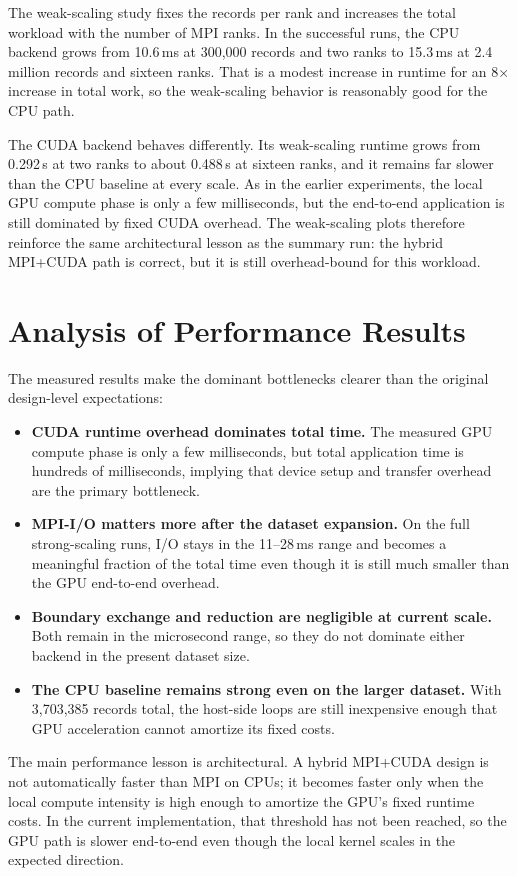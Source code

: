 \documentclass[sigconf,nonacm]{acmart}
\begin{document}
The weak-scaling study fixes the records per rank and increases the total workload with the number of MPI ranks. In the successful runs, the CPU backend grows from 10.6\,ms at 300,000 records and two ranks to 15.3\,ms at 2.4 million records and sixteen ranks. That is a modest increase in runtime for an 8$\times$ increase in total work, so the weak-scaling behavior is reasonably good for the CPU path.

The CUDA backend behaves differently. Its weak-scaling runtime grows from 0.292\,s at two ranks to about 0.488\,s at sixteen ranks, and it remains far slower than the CPU baseline at every scale. As in the earlier experiments, the local GPU compute phase is only a few milliseconds, but the end-to-end application is still dominated by fixed CUDA overhead. The weak-scaling plots therefore reinforce the same architectural lesson as the summary run: the hybrid MPI+CUDA path is correct, but it is still overhead-bound for this workload.

\section{Analysis of Performance Results}
The measured results make the dominant bottlenecks clearer than the original design-level expectations:
\begin{itemize}[leftmargin=*]
  \item \textbf{CUDA runtime overhead dominates total time.} The measured GPU compute phase is only a few milliseconds, but total application time is hundreds of milliseconds, implying that device setup and transfer overhead are the primary bottleneck.
  \item \textbf{MPI-I/O matters more after the dataset expansion.} On the full strong-scaling runs, I/O stays in the 11--28\,ms range and becomes a meaningful fraction of the total time even though it is still much smaller than the GPU end-to-end overhead.
  \item \textbf{Boundary exchange and reduction are negligible at current scale.} Both remain in the microsecond range, so they do not dominate either backend in the present dataset size.
  \item \textbf{The CPU baseline remains strong even on the larger dataset.} With 3,703,385 records total, the host-side loops are still inexpensive enough that GPU acceleration cannot amortize its fixed costs.
\end{itemize}

The main performance lesson is architectural. A hybrid MPI+CUDA design is not automatically faster than MPI on CPUs; it becomes faster only when the local compute intensity is high enough to amortize the GPU’s fixed runtime costs. In the current implementation, that threshold has not been reached, so the GPU path is slower end-to-end even though the local kernel scales in the expected direction.
\end{document}
